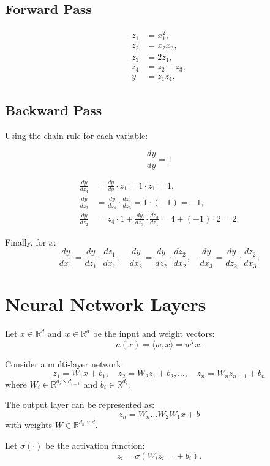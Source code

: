 \documentclass{article}
\begin{document}
\subsection{Forward Pass}
\begin{align*}
z_1 &= x_1^2, \\
z_2 &= x_2 x_3, \\
z_3 &= 2 z_1, \\
z_4 &= z_2 - z_3, \\
y &= z_1 z_4.
\end{align*}

\subsection{Backward Pass}
Using the chain rule for each variable:

\[
\frac{dy}{dy} = 1
\]

\begin{align*}
\frac{dy}{dz_4} &= \frac{dy}{dy} \cdot z_1 = 1 \cdot z_1 = 1, \\
\frac{dy}{dz_3} &= \frac{dy}{dz_4} \cdot \frac{dz_4}{dz_3} = 1 \cdot (-1) = -1, \\
\frac{dy}{dz_2} &= z_4 \cdot 1 + \frac{dy}{dz_3} \cdot \frac{dz_3}{dz_1} = 4 + (-1) \cdot 2 = 2.
\end{align*}

Finally, for \( x \):
\[
\frac{dy}{dx_1} = \frac{dy}{dz_1} \cdot \frac{dz_1}{dx_1}, \quad \frac{dy}{dx_2} = \frac{dy}{dz_2} \cdot \frac{dz_2}{dx_2}, \quad \frac{dy}{dx_3} = \frac{dy}{dz_2} \cdot \frac{dz_2}{dx_3}.
\]


\section{Neural Network Layers}

Let \( x \in \mathbb{R}^d \) and \( w \in \mathbb{R}^d \) be the input and weight vectors:
\[
a(x) = \langle w, x \rangle = w^T x.
\]

Consider a multi-layer network:
\[
z_1 = W_1 x + b_1, \quad z_2 = W_2 z_1 + b_2, \dots, \quad z_n = W_n z_{n-1} + b_n
\]
where \( W_i \in \mathbb{R}^{d_i \times d_{i-1}} \) and \( b_i \in \mathbb{R}^{d_i} \).

The output layer can be represented as:
\[
z_n = W_n \dots W_2 W_1 x + b
\]
with weights \( W \in \mathbb{R}^{d_n \times d} \).

Let \( \sigma(\cdot) \) be the activation function:
\[
z_i = \sigma(W_i z_{i-1} + b_i).
\]
\end{document}
